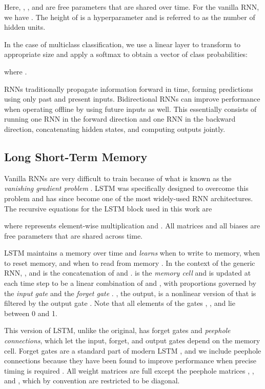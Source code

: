 \documentclass{llncs}
\begin{document}
Here, , , and  are free parameters that are shared over time. For the vanilla RNN, we have . The height of  is a hyperparameter and is referred to as the number of hidden units.

In the case of multiclass classification, we use a linear layer to transform  to appropriate size  and apply a softmax to obtain a vector of class probabilities:

where .

RNNs traditionally propagate information forward in time, forming predictions using only past and present inputs. Bidirectional RNNs \cite{schuster1997bidirectional} can improve performance when operating offline by using future inputs as well. This essentially consists of running one RNN in the forward direction and one RNN in the backward direction, concatenating hidden states, and computing outputs jointly.

\subsection{Long Short-Term Memory}

Vanilla RNNs are very difficult to train because of what is known as the \emph{vanishing gradient problem} \cite{bengio1994learning}. LSTM \cite{hochreiter1997long} was specifically designed to overcome this problem and has since become one of the most widely-used RNN architectures. The recursive equations for the LSTM block used in this work are

where  represents element-wise multiplication and . All matrices  and all biases  are free parameters that are shared across time.

LSTM maintains a memory over time and \emph{learns} when to write to memory, when to reset memory, and when to read from memory \cite{graves2012supervised}. In the context of the generic RNN, , and  is the concatenation of  and .  is the \emph{memory cell} and is updated at each time step to be a linear combination of  and , with proportions governed by the \emph{input gate}  and the \emph{forget gate} . , the output, is a nonlinear version of  that is filtered by the output gate . Note that all elements of the gates , , and  lie between 0 and 1.

This version of LSTM, unlike the original, has forget gates and \emph{peephole connections}, which let the input, forget, and output gates depend on the memory cell. Forget gates are a standard part of modern LSTM \cite{greff2015lstm}, and we include peephole connections because they have been found to improve performance when precise timing is required \cite{gers2000recurrent}. All weight matrices are full except the peephole matrices , , and , which by convention are restricted to be diagonal.
\end{document}
